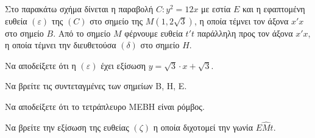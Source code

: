 Στο παρακάτω σχήμα δίνεται η παραβολή $C: y^2 = 12x$ με εστία $E$ και η εφαπτομένη ευθεία $(\varepsilon)$ της $(C)$ στο σημείο της $M(1,2\sqrt{3})$, η οποία τέμνει τον άξονα $x'x$ στο σημείο $B$. Από το σημείο $M$ φέρνουμε ευθεία $t't$ παράλληλη προς τον άξονα $x'x$, η οποία τέμνει την διευθετούσα $(\delta)$ στο σημείο $H$.

\begin{alist}
\item Να αποδείξετε ότι η $(\varepsilon)$ έχει εξίσωση $y = \sqrt{3} \cdot x + \sqrt{3}$. 
\item Να βρείτε τις συντεταγμένες των σημείων B, H, E. 
\item Να αποδείξετε ότι το τετράπλευρο MEBH είναι ρόμβος. 
\item Να βρείτε την εξίσωση της ευθείας $(\zeta)$ η οποία διχοτομεί την γωνία $E\widehat{M}t$. 
\end{alist}